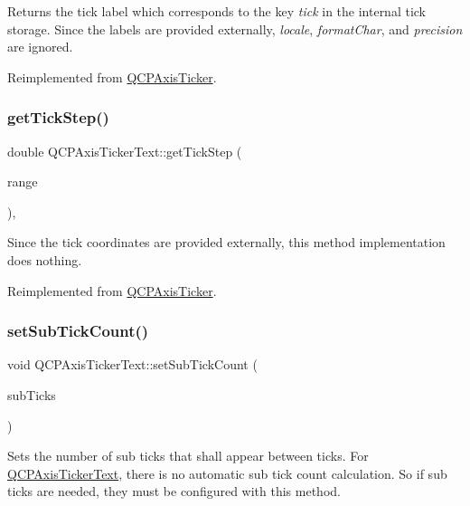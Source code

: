 Returns the tick label which corresponds to the key {\itshape tick} in the internal tick storage. Since the labels are provided externally, {\itshape locale}, {\itshape format\+Char}, and {\itshape precision} are ignored.

Reimplemented from \hyperlink{classQCPAxisTicker}{Q\+C\+P\+Axis\+Ticker}.

\mbox{\label{classQCPAxisTickerText_a628f16c41905e8c95c6622d6757a38c4}} 
\subsubsection{\texorpdfstring{get\+Tick\+Step()}{getTickStep()}}
{\footnotesize\ttfamily double Q\+C\+P\+Axis\+Ticker\+Text\+::get\+Tick\+Step (\begin{DoxyParamCaption}\item[{const \hyperlink{classQCPRange}{Q\+C\+P\+Range} \&}]{range }\end{DoxyParamCaption})\hspace{0.3cm}{\ttfamily [protected]}, {\ttfamily [virtual]}}

Since the tick coordinates are provided externally, this method implementation does nothing.

Reimplemented from \hyperlink{classQCPAxisTicker}{Q\+C\+P\+Axis\+Ticker}.

\mbox{\label{classQCPAxisTickerText_a8cfa50c51183c90186892eeef978d571}} 
\subsubsection{\texorpdfstring{set\+Sub\+Tick\+Count()}{setSubTickCount()}}
{\footnotesize\ttfamily void Q\+C\+P\+Axis\+Ticker\+Text\+::set\+Sub\+Tick\+Count (\begin{DoxyParamCaption}\item[{int}]{sub\+Ticks }\end{DoxyParamCaption})}

Sets the number of sub ticks that shall appear between ticks. For \hyperlink{classQCPAxisTickerText}{Q\+C\+P\+Axis\+Ticker\+Text}, there is no automatic sub tick count calculation. So if sub ticks are needed, they must be configured with this method. \mbox{\label{classQCPAxisTickerText_a8cdf1f21940f1f53f5e3d30b2c74f5cf}} 
